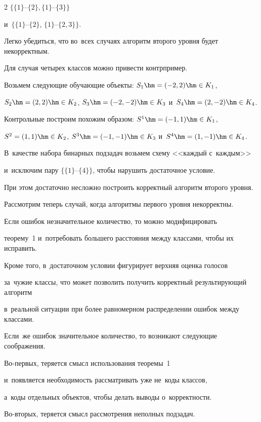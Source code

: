 \begin{multicols}{2}
$\{\{1\}\mbox{--}\{2\}, \{1\}\mbox{--}\{3\}\}$ 


и~$\{\{1\}\mbox{--}\{2\}$, $\{1\}\mbox{--}\{2,3\}\}$.


Легко убедиться, что во~всех случаях алгоритм второго уровня будет некорректным.





Для случая четырех классов можно привести контрпример.


Возьмем следующие обучающие объекты: $S_1\hm=(-2, 2)\hm\in K_1$, 


$S_2\hm=(2, 2)\hm\in K_2$, $S_3\hm=(-2, -2)\hm\in K_3$ и~$S_4\hm=(2, -2)\hm\in K_4$.


Контрольные построим похожим образом: $S^1\hm=(-1, 1)\hm\in K_1$, 


$S^2=(1, 1)\hm\in K_2$, $S^3\hm=(-1, -1)\hm\in K_3$ и~$S^4\hm=(1, -1)\hm\in K_4$.


В~качестве набора бинарных подзадач возьмем схему <<каждый с~каждым>> 


и~исключим пару $\{\{1\}\mbox{--}\{4\}\}$, чтобы нарушить достаточное условие.


При этом достаточно несложно построить корректный алгоритм второго уровня.





Рассмотрим теперь случай, когда алгоритмы первого уровня некорректны.


Если ошибок незначительное количество, то можно модифицировать 


теорему~1 и~потребовать большего расстояния между классами, чтобы их исправить.


Кроме того, в~достаточном условии фигурирует верхняя оценка голосов 


за~чужие классы, что может позволить получить корректный результирующий алгоритм 


в~реальной ситуации при более равномерном распределении ошибок между классами.





Если~же ошибок значительное количество, то возникают следующие соображения.


Во-пер\-вых, теряется смысл использования теоремы~1 


и~появляется необходимость рассматривать уже не~коды классов, 


а~коды отдельных объектов, чтобы делать выводы о~корректности.


Во-вто\-рых, теряется смысл рассмотрения неполных подзадач.



\end{multicols}
